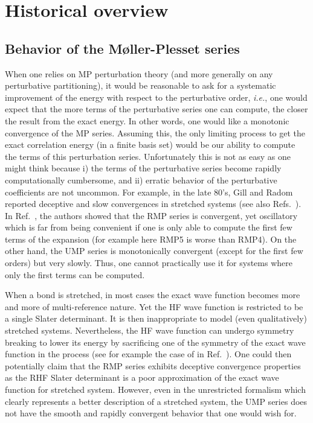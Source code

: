 \documentclass[aps,prb,reprint,noshowkeys,superscriptaddress]{revtex4-1}
\newcommand{\ie}{\textit{i.e.}}
\begin{document}
\section{Historical overview}

\subsection{Behavior of the M{\o}ller-Plesset series}

When one relies on MP perturbation theory (and more generally on any perturbative partitioning), it would be reasonable to ask for a systematic improvement of the energy with respect to the perturbative order, \ie, one would expect that the more terms of the perturbative series one can compute, the closer the result from the exact energy.
In other words, one would like a monotonic convergence of the MP series. Assuming this, the only limiting process to get the exact correlation energy (in a finite basis set) would be our ability to compute the terms of this perturbation series.
Unfortunately this is not as easy as one might think because i) the terms of the perturbative series become rapidly computationally cumbersome, and ii) erratic behavior of the perturbative coefficients are not uncommon. For example, in the late 80's, Gill and Radom reported deceptive and slow convergences in stretched systems \cite{Gill_1986, Gill_1988} (see also Refs.~). 
In Ref.~, the authors showed that the RMP series is convergent, yet oscillatory which is far from being convenient if one is only able to compute the first few terms of the expansion (for example here RMP5 is worse than RMP4). 
On the other hand, the UMP series is monotonically convergent (except for the first few orders) but very slowly. 
Thus, one cannot practically use it for systems where only the first terms can be computed.

When a bond is stretched, in most cases the exact wave function becomes more and more of multi-reference nature. 
Yet the HF wave function is restricted to be a single Slater determinant.
It is then inappropriate to model (even qualitatively) stretched systems. Nevertheless, the HF wave function can undergo symmetry breaking to lower its energy by sacrificing one of the symmetry of the exact wave function in the process (see for example the case of  in Ref.~). 
One could then potentially claim that the RMP series exhibits deceptive convergence properties as the RHF Slater determinant is a poor approximation of the exact wave function for stretched system. However, even in the unrestricted formalism which clearly represents a better description of a stretched system, the UMP series does not have the smooth and rapidly convergent behavior that one would wish for. 
\end{document}
